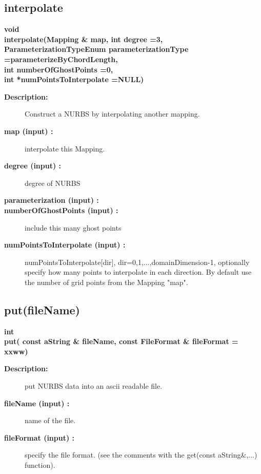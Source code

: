 \subsection{interpolate}
 
\begin{flushleft} \textbf{%
void  \\ 
\settowidth{\NurbsMappingIncludeArgIndent}{interpolate(}%
interpolate(Mapping \& map, int degree  =3, \\ 
\hspace{\NurbsMappingIncludeArgIndent}ParameterizationTypeEnum parameterizationType  =parameterizeByChordLength,\\ 
\hspace{\NurbsMappingIncludeArgIndent}int numberOfGhostPoints  =0,\\ 
\hspace{\NurbsMappingIncludeArgIndent}int *numPointsToInterpolate  =NULL)
}\end{flushleft}
\begin{description}
\item[{\bf Description:}] 
   Construct a NURBS by interpolating another mapping.
\item[{\bf map (input) :}]  interpolate this Mapping.
\item[{\bf degree (input) :}]  degree of NURBS
\item[{\bf parameterization (input) :}]  
\item[{\bf numberOfGhostPoints (input) :}]  include this many ghost points
\item[{\bf numPointsToInterpolate (input) :}]  numPointsToInterpolate[dir], dir=0,1,...,domainDimension-1, 
       optionally specify how many points to interpolate in each direction. By default use the number 
       of grid points from the Mapping "map". 
\end{description}
\subsection{put(fileName)}
 
\begin{flushleft} \textbf{%
int  \\ 
\settowidth{\NurbsMappingIncludeArgIndent}{put(}%
put( const aString \& fileName, const FileFormat \& fileFormat  = xxww) 
}\end{flushleft}
\begin{description}
\item[{\bf Description:}] 
   put NURBS data into an ascii readable file.
\item[{\bf fileName (input) :}]  name of the file.
\item[{\bf fileFormat (input) :}]  specify the file format. (see the comments with the get(const aString\&,...) function).
\end{description}
